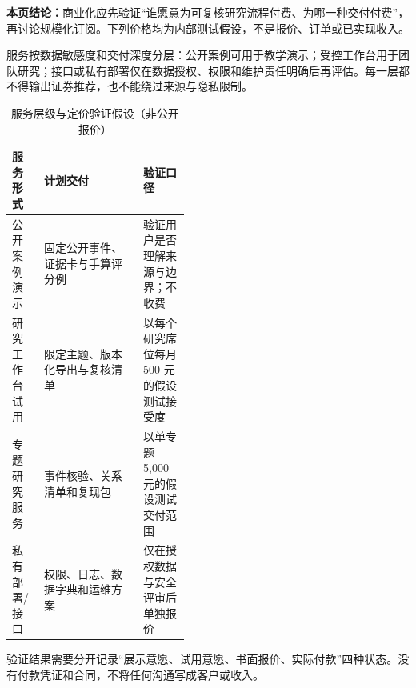 \textbf{本页结论：}商业化应先验证“谁愿意为可复核研究流程付费、为哪一种交付付费”，再讨论规模化订阅。下列价格均为内部测试假设，不是报价、订单或已实现收入。

服务按数据敏感度和交付深度分层：公开案例可用于教学演示；受控工作台用于团队研究；接口或私有部署仅在数据授权、权限和维护责任明确后再评估。每一层都不得输出证券推荐，也不能绕过来源与隐私限制。

\begin{table}[htbp]
\centering
\caption{服务层级与定价验证假设（非公开报价）}
\label{tab:wty-pricing-plan}
\small
\begin{tabularx}{\linewidth}{p{0.18\linewidth}X p{0.26\linewidth}}
\toprule
服务形式 & 计划交付 & 验证口径 \\
\midrule
公开案例演示 & 固定公开事件、证据卡与手算评分例 & 验证用户是否理解来源与边界；不收费 \\
研究工作台试用 & 限定主题、版本化导出与复核清单 & 以每个研究席位每月 500 元的假设测试接受度 \\
专题研究服务 & 事件核验、关系清单和复现包 & 以单专题 5,000 元的假设测试交付范围 \\
私有部署/接口 & 权限、日志、数据字典和运维方案 & 仅在授权数据与安全评审后单独报价 \\
\bottomrule
\end{tabularx}
\end{table}

验证结果需要分开记录“展示意愿、试用意愿、书面报价、实际付款”四种状态。没有付款凭证和合同，不将任何沟通写成客户或收入。
